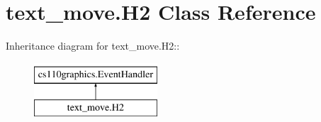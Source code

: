 \hypertarget{classtext__move_1_1H2}{
\section{text\_\-move.H2 Class Reference}
\label{classtext__move_1_1H2}
}
Inheritance diagram for text\_\-move.H2::\begin{figure}[H]
\begin{center}
\leavevmode
\includegraphics[height=2cm]{classtext__move_1_1H2}
\end{center}
\end{figure}
